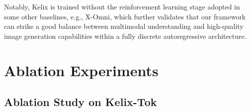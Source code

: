\documentclass[11pt, a4paper, logo, copyright]{googledeepmind}
\begin{document}
Notably, Kelix is trained without the reinforcement learning stage adopted in some other baselines, e.g., X-Omni, which further validates that our framework can strike a good balance between multimodal understanding and high-quality image generation capabilities within a fully discrete autoregressive architecture.




\section{Ablation Experiments}
\subsection{Ablation Study on Kelix-Tok}



\end{document}
